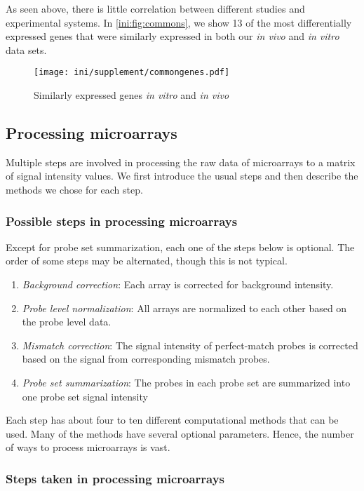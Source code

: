 As seen above, there is little correlation between different studies
and experimental systems. In \autoref{ini:fig:commons}, we show
13 of the most differentially expressed genes that were similarly 
expressed in both our \emph{in vivo} and \emph{in vitro} data sets.

\begin{figure}[ht]
\centering
\texttt{[image: ini/supplement/commongenes.pdf]}
\caption{Similarly expressed genes \emph{in vitro} and \emph{in vivo}}
\label{ini:fig:commons}
\end{figure}

\subsection{Processing microarrays}

Multiple steps are involved in processing the raw data of microarrays
to a matrix of signal intensity values. We first 
introduce the usual steps and then describe the methods we chose
for each step.

\subsubsection{Possible steps in processing microarrays}

Except for probe set summarization, each one of the steps below is
optional. The order of some steps may be alternated, though this is not
typical. 

\begin{enumerate}
  \item \emph{Background correction}: Each array is corrected for background intensity.
  \item \emph{Probe level normalization}: All arrays are normalized to each 
  other based on the probe level data.
  \item \emph{Mismatch correction}: The signal intensity of perfect-match probes 
  is corrected based on the signal from corresponding mismatch probes.
  \item \emph{Probe set summarization}: The probes in each probe set are 
  summarized into one probe set signal intensity
\end{enumerate}

Each step has about four to ten different computational
methods that can be used. Many of the methods have several optional parameters.
Hence, the number of ways to process microarrays is vast.

\subsubsection{Steps taken in processing microarrays}

